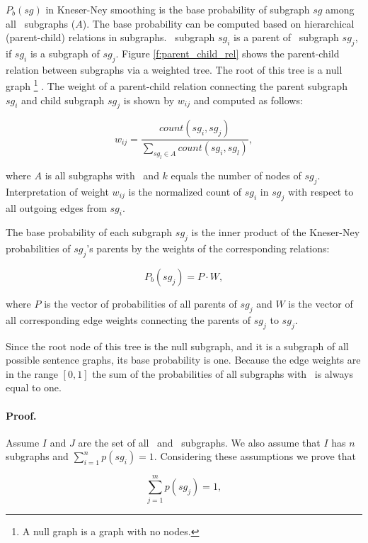 $P_b(sg)$ in Kneser-Ney smoothing is the base probability of
subgraph $sg$ among all \knode\ subgraphs ($A$). The base
probability can be computed based on hierarchical (parent-child)
relations in subgraphs. \knode\ subgraph $sg_i$ is a parent
of \kplusnode\ subgraph $sg_j$, if $sg_i$ is a subgraph of
$sg_j$. Figure \ref{f:parent_child_rel} shows the parent-child
relation between subgraphs via a weighted tree. The root of this tree
is a null graph%
%
\footnote{A null graph is a graph with no nodes.}%
%
. The weight of a parent-child relation connecting the parent
subgraph $sg_i$ and child subgraph $sg_j$ is shown by $w_{ij}$ and
computed as follows:

\begin{equation*}
w_{ij} = \frac{count(sg_i, sg_j)}{\sum_{sg_l \in A}count(sg_i,sg_l)},
\end{equation*}

\noindent
where $A$ is all subgraphs with \knode\ and $k$ equals the number of
nodes of $sg_j$. Interpretation of weight $w_{ij}$ is the normalized count of $sg_i$ in $sg_j$ with respect to all outgoing edges from $sg_i$.

The base probability of each subgraph $sg_j$ is the inner product
of the Kneser-Ney probabilities of $sg_j$'s parents by the weights of
the corresponding relations:

\begin{equation}
P_b(sg_j)  = P \cdot W,
\end{equation}

\noindent
where $P$ is the vector of probabilities of all parents of 
$sg_j$ and $W$ is the vector of all corresponding edge weights
connecting the parents of $sg_j$ to $sg_j$.

Since the root node of this tree is the null subgraph, and it is a
subgraph of all possible sentence graphs, its base probability is
one. Because the edge weights are in the range $\left[0,1\right]$ the
sum of the probabilities of all subgraphs with \knode\ is always
equal to one.

\paragraph{Proof.} 
Assume $I$ and $J$ are the set of all \knode\ and \kplusnode\
subgraphs. We also assume that $I$ has $n$ subgraphs and $\sum_{i=1}^n
p(sg_i)=1$. Considering these assumptions we prove that

\begin{equation*}
\sum_{j=1}^m p(sg_j)=1,
\end{equation*}

